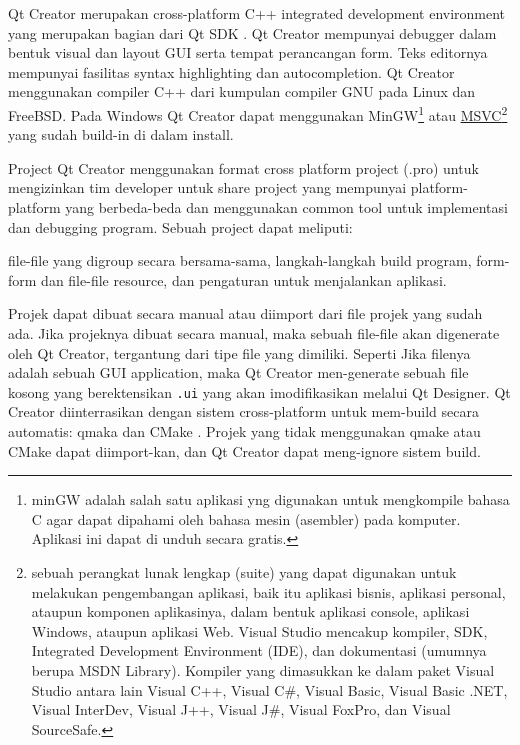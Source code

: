Qt Creator merupakan cross-platform C++ integrated development
environment yang merupakan bagian dari Qt SDK . Qt Creator mempunyai
debugger dalam bentuk visual dan layout GUI  serta tempat perancangan
form. Teks editornya mempunyai fasilitas syntax highlighting dan
autocompletion. Qt Creator menggunakan compiler C++ dari kumpulan
compiler GNU pada Linux dan FreeBSD. Pada Windows  Qt Creator dapat
menggunakan MinGW\footnote{minGW adalah salah satu aplikasi yng
  digunakan untuk mengkompile bahasa C agar dapat dipahami oleh bahasa
  mesin (asembler) pada komputer. Aplikasi ini dapat di unduh secara
  gratis.} atau
\href{https://id.wikipedia.org/wiki/Microsoft_Visual_Studio_Express}{MSVC}\footnote{sebuah perangkat lunak lengkap (suite) yang dapat digunakan untuk melakukan pengembangan aplikasi, baik itu aplikasi bisnis, aplikasi personal, ataupun komponen aplikasinya, dalam bentuk aplikasi console, aplikasi Windows, ataupun aplikasi Web. Visual Studio mencakup kompiler, SDK, Integrated Development Environment (IDE), dan dokumentasi (umumnya berupa MSDN Library). Kompiler yang dimasukkan ke dalam paket Visual Studio antara lain Visual C++, Visual C\#, Visual Basic, Visual Basic .NET, Visual InterDev, Visual J++, Visual J\#, Visual FoxPro, dan Visual SourceSafe.}
yang sudah build-in di dalam install.

Project Qt Creator menggunakan format cross platform project (.pro)
untuk mengizinkan tim developer untuk share project yang mempunyai
platform-platform yang berbeda-beda dan menggunakan common tool untuk
implementasi dan debugging program. Sebuah project dapat meliputi:

file-file yang digroup secara bersama-sama, langkah-langkah build
program, form-form dan file-file resource, dan pengaturan untuk
menjalankan aplikasi.

Projek dapat dibuat secara manual atau diimport dari file projek yang
sudah ada. Jika projeknya dibuat secara manual, maka sebuah file-file
akan digenerate oleh Qt Creator, tergantung dari tipe file yang
dimiliki. Seperti Jika filenya adalah sebuah GUI application, maka Qt
Creator men-generate sebuah file kosong yang berektensikan \texttt{.ui}
yang akan imodifikasikan melalui Qt Designer. Qt Creator diinterrasikan
dengan sistem cross-platform untuk mem-build secara automatis: qmaka dan CMake
. Projek yang tidak menggunakan qmake atau CMake dapat
diimport-kan, dan Qt Creator dapat meng-ignore sistem build.

